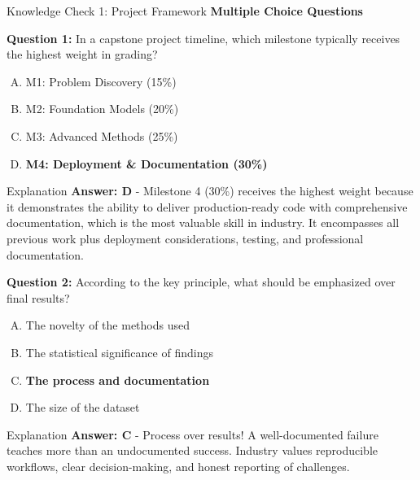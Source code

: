 \begin{frame}{Knowledge Check 1: Project Framework}
\textbf{Multiple Choice Questions}

\vspace{0.3cm}

\textbf{Question 1:} In a capstone project timeline, which milestone typically receives the highest weight in grading?

\begin{enumerate}[A)]
\item M1: Problem Discovery (15\%)
\item M2: Foundation Models (20\%)
\item M3: Advanced Methods (25\%)
\item \textcolor{forest}{\textbf{M4: Deployment \& Documentation (30\%)}}
\end{enumerate}

\pause

\begin{block}{Explanation}
\textcolor{forest}{\textbf{Answer: D}} - Milestone 4 (30\%) receives the highest weight because it demonstrates the ability to deliver production-ready code with comprehensive documentation, which is the most valuable skill in industry. It encompasses all previous work plus deployment considerations, testing, and professional documentation.
\end{block}

\pause

\vspace{0.2cm}

\textbf{Question 2:} According to the key principle, what should be emphasized over final results?

\begin{enumerate}[A)]
\item The novelty of the methods used
\item The statistical significance of findings
\item \textcolor{forest}{\textbf{The process and documentation}}
\item The size of the dataset
\end{enumerate}

\pause

\begin{block}{Explanation}
\textcolor{forest}{\textbf{Answer: C}} - Process over results! A well-documented failure teaches more than an undocumented success. Industry values reproducible workflows, clear decision-making, and honest reporting of challenges.
\end{block}
\end{frame}

